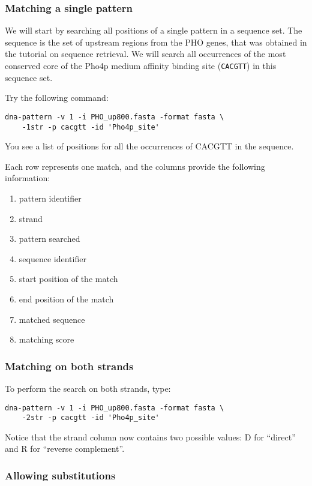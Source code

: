 \subsubsection{Matching a single pattern}

We will start by searching all positions of a single pattern in a
sequence set. The sequence is the set of upstream regions from the PHO
genes, that was obtained in the tutorial on sequence retrieval. We
will search all occurrences of the most conserved core of the Pho4p
medium affinity binding site (\texttt{CACGTT}) in this sequence set.

Try the following command:

\begin{verbatim}
dna-pattern -v 1 -i PHO_up800.fasta -format fasta \ 
    -1str -p cacgtt -id 'Pho4p_site'
\end{verbatim}

You see a list of positions for all the occurrences of CACGTT in the sequence.

Each row represents one match, and the columns provide the following
information:
\begin{enumerate}
\item pattern identifier
\item strand
\item pattern searched
\item sequence identifier
\item start position of the match
\item end position of the match
\item matched sequence
\item matching score
\end{enumerate}

\subsubsection{Matching on both strands}

To perform the search on both strands, type:
\begin{verbatim}
dna-pattern -v 1 -i PHO_up800.fasta -format fasta \ 
    -2str -p cacgtt -id 'Pho4p_site'
\end{verbatim}

Notice that the strand column now contains two possible values: D for
``direct'' and R for ``reverse complement''.

\subsubsection{Allowing substitutions}

